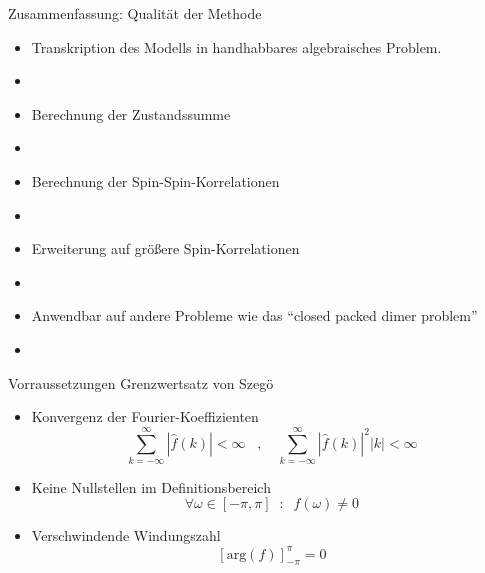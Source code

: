 \documentclass[11pt]{beamer}
\begin{document}
    \begin{frame}{Zusammenfassung: Qualität der Methode}
    
    \begin{itemize}
    \item Transkription des Modells in handhabbares algebraisches Problem. 
    \item[]
    \item Berechnung der Zustandssumme
    \item[]
    \item Berechnung der Spin-Spin-Korrelationen
    \item[]
    \item Erweiterung auf größere Spin-Korrelationen
    \item[]
    \item Anwendbar auf andere Probleme wie das 
    ``closed packed dimer problem''
    \item[]
    \end{itemize}
    
    
    \end{frame}
    
    \begin{frame}
        \centering 
    \end{frame}

    \begin{frame}{Vorraussetzungen Grenzwertsatz von Szegö}
        \begin{itemize}
            \item Konvergenz der Fourier-Koeffizienten
            \begin{equation} \nonumber
                \sum_{k = -\infty}^{\infty} |\hat{f}(k)| < \infty \;\;\;\text{, }\;\;\;
                \sum_{k = -\infty}^{\infty} |\hat{f}(k)|^2 |k| < \infty 
            \end{equation}
            
            \item Keine Nullstellen im Definitionsbereich
            \begin{equation} \nonumber
            \forall \omega \in [-\pi,\pi]\;\; :\;\; f(\omega) \neq 0
            \end{equation}
            
            \item Verschwindende Windungszahl 
            \begin{equation} \nonumber
            \left[\mathrm{arg}\left( f\right)\right]_{-\pi}^{\pi} = 0 
            \end{equation}
            \end{itemize}
        \end{frame}
\end{document}
